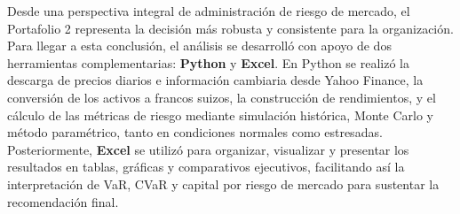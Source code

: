 
Desde una perspectiva integral de administraci\'on de riesgo de mercado, el Portafolio 2 representa la decisi\'on m\'as robusta y consistente para la organizaci\'on. Para llegar a esta conclusi\'on, el an\'alisis se desarroll\'o con apoyo de dos herramientas complementarias: \textbf{Python} y \textbf{Excel}. En Python se realiz\'o la descarga de precios diarios e informaci\'on cambiaria desde Yahoo Finance, la conversi\'on de los activos a francos suizos, la construcci\'on de rendimientos, y el c\'alculo de las m\'etricas de riesgo mediante simulaci\'on hist\'orica, Monte Carlo y m\'etodo param\'etrico, tanto en condiciones normales como estresadas. Posteriormente, \textbf{Excel} se utiliz\'o para organizar, visualizar y presentar los resultados en tablas, gr\'aficas y comparativos ejecutivos, facilitando as\'i la interpretaci\'on de VaR, CVaR y capital por riesgo de mercado para sustentar la recomendaci\'on final.